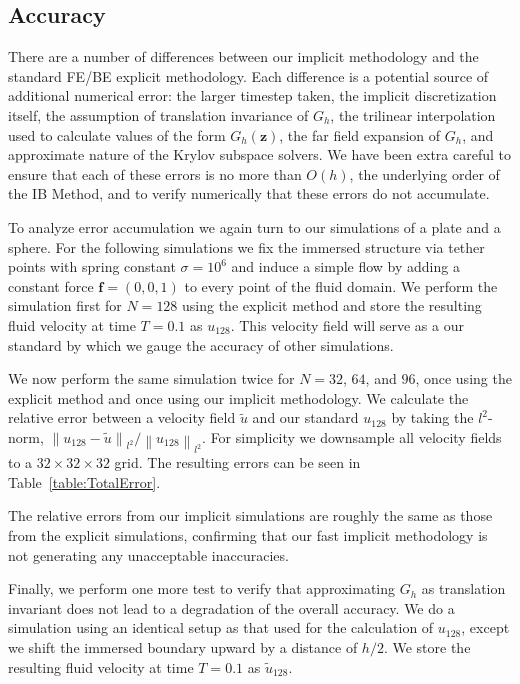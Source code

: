 \documentclass[preprint,12pt]{elsarticle}
\newcommand{\norm}[1]{\left\lVert#1\right\rVert}
\newcommand{\B}[1]{\mathbf{#1}}
\begin{document}
\subsection{Accuracy}
There are a number of differences between our implicit methodology and the standard FE/BE explicit methodology. Each difference is a potential source of additional numerical error: the larger timestep taken, the implicit discretization itself, the assumption of translation invariance of $G_h$, the trilinear interpolation used to calculate values of the form $G_h(\B{z})$, the far field expansion of $G_h$, and approximate nature of  the Krylov subspace solvers. We have been extra careful to ensure that each of these errors is 
 no more than $O(h)$, the underlying order of the IB Method, and to verify numerically that these errors do not accumulate. 
 
To analyze error accumulation we again turn to our simulations of a plate and a sphere. For the following simulations we fix the immersed structure via tether points with spring constant $\sigma=10^6$ and induce a simple flow by adding a constant force $\B{f} = (0,0,1)$ to every point of the fluid domain. We perform the simulation first for $N=128$ using the explicit method and store the resulting fluid velocity at time $T=0.1$ as $u_{128}$. This velocity field will serve as a our standard by which we gauge the accuracy of other simulations.

We now perform the same simulation twice for $N=32$, $64$, and $96$, once using the explicit method and once using our implicit methodology. We calculate the relative error between a velocity field $\tilde{u}$ and our standard $u_{128}$ by taking the $l^2$-norm, $\norm{u_{128} - \tilde{u}}_{l^2} / \norm{u_{128}}_{l^2}$. For simplicity we downsample all velocity fields to a $32\times 32\times 32$ grid. The resulting errors can be seen in Table~\ref{table:TotalError}.

The relative errors from our implicit simulations are roughly the same as those from the explicit simulations, confirming that our fast implicit methodology is not generating any unacceptable inaccuracies.


Finally, we perform one more test to verify that approximating $G_h$ as translation invariant does not lead to a degradation of the overall accuracy. We do a simulation using an identical setup as that used for the calculation of $u_{128}$, except we shift the immersed boundary upward by a distance of $h/2$. We store the resulting fluid velocity at time $T=0.1$ as $\tilde{u}_{128}$.
\end{document}

